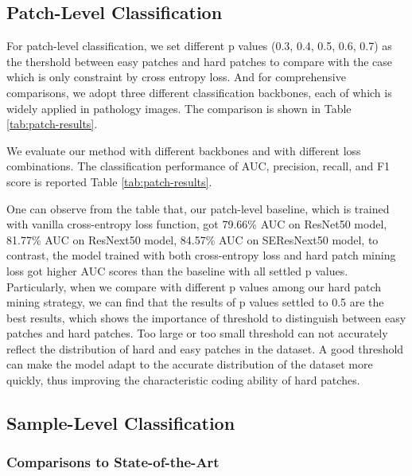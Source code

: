 \subsection{Patch-Level Classification}\label{section-4-2}

For patch-level classification, we set different p values (0.3, 0.4, 0.5, 0.6, 0.7) as the thershold between easy patches and hard patches to compare with the case which is only constraint by cross entropy loss. And for comprehensive comparisons, we adopt three different classification backbones, each of which is widely applied in pathology images. The comparison is shown in Table \ref{tab:patch-results}.



We evaluate our method with different backbones and with different loss combinations. 
The classification performance of AUC, precision, recall, and F1 score is reported Table \ref{tab:patch-results}.


One can observe from the table that, our patch-level baseline, which is trained with vanilla cross-entropy loss function, got 79.66\% AUC on ResNet50 model, 81.77\% AUC on ResNext50 model, 84.57\% AUC on SEResNext50 model, to contrast, the model trained with both cross-entropy loss and hard patch mining loss got higher AUC scores than the baseline with all settled p values. Particularly, when we compare with different p values among our hard patch mining strategy, we can find that the results of p values settled to 0.5 are the best results, which shows the importance of threshold to distinguish between easy patches and hard patches. Too large or too small threshold can not accurately reflect the distribution of hard and easy patches in the dataset. A good threshold can make the model adapt to the accurate distribution of the dataset more quickly, thus improving the characteristic coding ability of hard patches. 
\par





\subsection{Sample-Level Classification}\label{section-4-3}
\subsubsection{Comparisons to State-of-the-Art}

